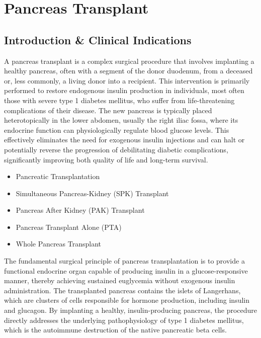 \chapter{Pancreas Transplant}

\section*{Introduction \& Clinical Indications}
A pancreas transplant is a complex surgical procedure that involves implanting a healthy pancreas, often with a segment of the donor duodenum, from a deceased or, less commonly, a living donor into a recipient. This intervention is primarily performed to restore endogenous insulin production in individuals, most often those with severe type 1 diabetes mellitus, who suffer from life-threatening complications of their disease. The new pancreas is typically placed heterotopically in the lower abdomen, usually the right iliac fossa, where its endocrine function can physiologically regulate blood glucose levels. This effectively eliminates the need for exogenous insulin injections and can halt or potentially reverse the progression of debilitating diabetic complications, significantly improving both quality of life and long-term survival.

\begin{itemize}
  \item Pancreatic Transplantation
  \item Simultaneous Pancreas-Kidney (SPK) Transplant
  \item Pancreas After Kidney (PAK) Transplant
  \item Pancreas Transplant Alone (PTA)
  \item Whole Pancreas Transplant
\end{itemize}

The fundamental surgical principle of pancreas transplantation is to provide a functional endocrine organ capable of producing insulin in a glucose-responsive manner, thereby achieving sustained euglycemia without exogenous insulin administration. The transplanted pancreas contains the islets of Langerhans, which are clusters of cells responsible for hormone production, including insulin and glucagon. By implanting a healthy, insulin-producing pancreas, the procedure directly addresses the underlying pathophysiology of type 1 diabetes mellitus, which is the autoimmune destruction of the native pancreatic beta cells.

